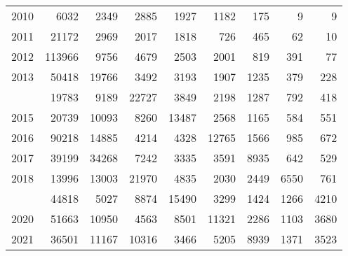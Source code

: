 \documentclass[
]{article}
\begin{document}
\begin{longtable}[t]{lrrrrrrrr}
2010 & 6032 & 2349 & 2885 & 1927 & 1182 & 175 & 9 & 9\\
2011 & 21172 & 2969 & 2017 & 1818 & 726 & 465 & 62 & 10\\
2012 & 113966 & 9756 & 4679 & 2503 & 2001 & 819 & 391 & 77\\
2013 & 50418 & 19766 & 3492 & 3193 & 1907 & 1235 & 379 & 228\\
\addlinespace
2014 & 19783 & 9189 & 22727 & 3849 & 2198 & 1287 & 792 & 418\\
2015 & 20739 & 10093 & 8260 & 13487 & 2568 & 1165 & 584 & 551\\
2016 & 90218 & 14885 & 4214 & 4328 & 12765 & 1566 & 985 & 672\\
2017 & 39199 & 34268 & 7242 & 3335 & 3591 & 8935 & 642 & 529\\
2018 & 13996 & 13003 & 21970 & 4835 & 2030 & 2449 & 6550 & 761\\
\addlinespace
2019 & 44818 & 5027 & 8874 & 15490 & 3299 & 1424 & 1266 & 4210\\
2020 & 51663 & 10950 & 4563 & 8501 & 11321 & 2286 & 1103 & 3680\\
2021 & 36501 & 11167 & 10316 & 3466 & 5205 & 8939 & 1371 & 3523\\*
\end{longtable}
\end{document}
